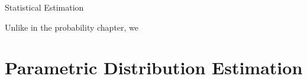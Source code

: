 \begin{chapter}{Statistical Estimation}











    Unlike in the probability chapter, we

    \section{Parametric Distribution Estimation}


\end{chapter}
